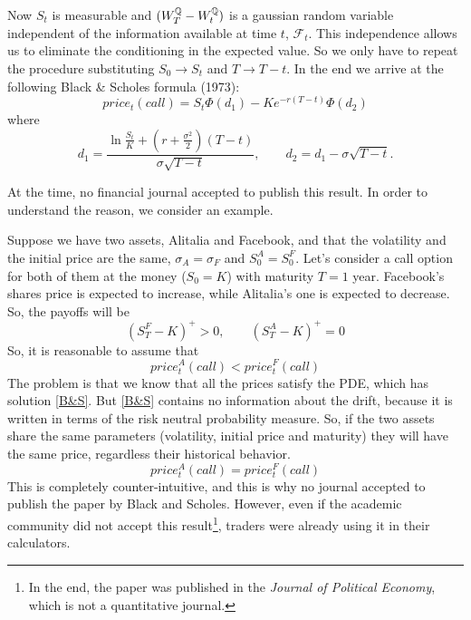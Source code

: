 Now $S_t$ is measurable and $(W_T^{\mathbb{Q}}-W_t^{\mathbb{Q}})$ is a gaussian random variable independent of the information available at time $t$, $\mathcal{F}_t $. This independence allows us to eliminate the conditioning in the expected value. So we only have to repeat the procedure substituting $S_0\to S_t$ and $T\to T-t$. In the end we arrive at the following Black \& Scholes formula (1973):
\begin{equation}\label{B&S}
    price_t(call) = S_t\Phi(d_1)-Ke^{-r(T-t)}\Phi(d_2)
\end{equation}
where
\begin{equation}\label{d}
    d_1 = \dfrac{\ln\frac{S_t}{K} + \left(r+\frac{\sigma^2}{2}\right)(T-t)}{\sigma\sqrt{T-t}}, \qquad d_2 = d_1 - \sigma\sqrt{T-t}.
\end{equation}

At the time, no financial journal accepted to publish this result. In order to understand the reason, we consider an example.
\begin{example}{}{}{}
    Suppose we have two assets, Alitalia and Facebook, and that the volatility and the initial price are the same, $\sigma_A = \sigma_F$ and $S_0^A = S_0^F$. Let's consider a call option for both of them at the money ($S_0=K$) with maturity $T=1$ year. Facebook's shares price is expected to increase, while Alitalia's one is expected to decrease. So, the payoffs will be
    \begin{equation*}
        (S_T^F-K)^+ > 0, \qquad (S_T^A-K)^+ = 0
    \end{equation*}
    So, it is reasonable to assume that 
    \begin{equation*}
        price^A_t(call) < price^F_t(call)
    \end{equation*}
    The problem is that we know that all the prices satisfy the PDE, which has solution \eqref{B&S}. But \eqref{B&S} contains no information about the drift, because it is written in terms of the risk neutral probability measure. So, if the two assets share the same parameters (volatility, initial price and maturity) they will have the same price, regardless their historical behavior. 
    \begin{equation*}
        price^A_t(call) = price^F_t(call)
    \end{equation*}
    This is completely counter-intuitive, and this is why no journal accepted to publish the paper by Black and Scholes. However, even if the academic community did not accept this result\footnote{In the end, the paper was published in the \emph{Journal of Political Economy}, which is not a quantitative journal.}, traders were already using it in their calculators.
\end{example}


